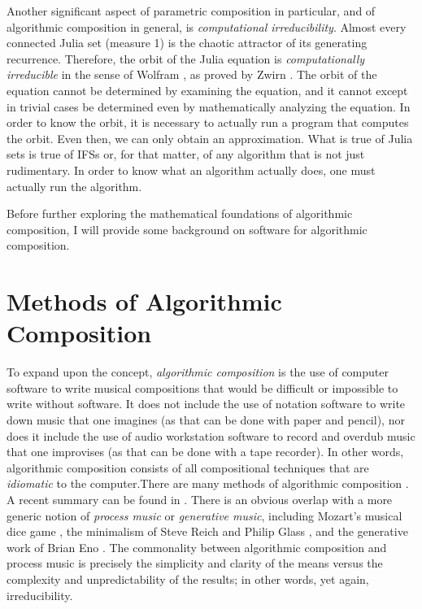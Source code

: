\documentclass[11pt,papersize=a4]{scrartcl}
\begin{document}
Another significant aspect of parametric composition in particular, and of algorithmic composition in general, is \emph{computational irreducibility}. Almost every connected Julia set (measure 1) is the chaotic attractor of its generating recurrence. Therefore, the orbit of the Julia equation is \emph{computationally irreducible} in the sense of Wolfram \parencite{wolfram1985undecidability}, as proved by Zwirn \parencite{zwirn2015computational}. The orbit of the equation cannot be determined by examining the equation, and it cannot except in trivial cases be determined even by mathematically analyzing the equation. In order to know the orbit, it is necessary to actually run a program that computes the orbit. Even then, we can only obtain an approximation. What is true of Julia sets is true of IFSs or, for that matter, of any algorithm that is not just rudimentary. In order to know what an algorithm actually does, one must actually run the algorithm.

Before further exploring the mathematical foundations of algorithmic composition, I will provide some background on software for algorithmic composition.

\section*{Methods of Algorithmic Composition}

To expand upon the concept, \emph{algorithmic composition} is the use of computer software to write musical compositions that would be difficult or impossible to write without software. It does not include the use of notation software to write down music that one imagines (as that can be done with paper and pencil), nor does it include the use of audio workstation software to record and overdub music that one improvises (as that can be done with a tape recorder). In other words, algorithmic composition consists of all compositional techniques that are \emph{idiomatic} to the computer.There are many methods of algorithmic composition \parencite{fernandez2013ai, arizanet}. A recent summary can be found in \parencite{mclean2018oxford}. There is an obvious overlap with a more generic notion of \emph{process music} or \emph{generative music}, including Mozart's musical dice game \parencite{humdrumdice}, the minimalism of Steve Reich \parencite{reichprocess, 10.2307/832600} and Philip Glass \parencite{potter2002four, glass2015words}, and the generative work of Brian Eno \parencite{eno1996generative}. The commonality between algorithmic composition and process music is precisely the simplicity and clarity of the means versus the complexity and unpredictability of the results; in other words, yet again, irreducibility. 
\end{document}

